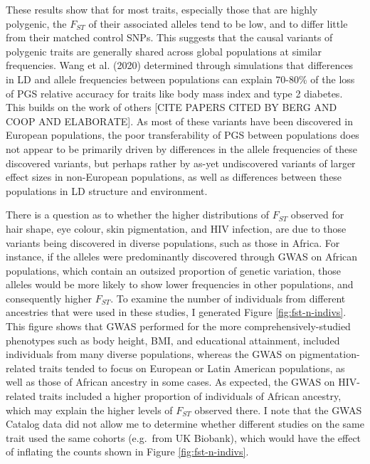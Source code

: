 \documentclass[
]{book}
\begin{document}
These results show that for most traits, especially those that are highly polygenic, the \(F_{ST}\) of their associated alleles tend to be low, and to differ little from their matched control SNPs. This suggests that the causal variants of polygenic traits are generally shared across global populations at similar frequencies. Wang et al. (2020) determined through simulations that differences in LD and allele frequencies between populations can explain 70-80\% of the loss of PGS relative accuracy for traits like body mass index and type 2 diabetes. This builds on the work of others {[}CITE PAPERS CITED BY BERG AND COOP AND ELABORATE{]}. As most of these variants have been discovered in European populations, the poor transferability of PGS between populations does not appear to be primarily driven by differences in the allele frequencies of these discovered variants, but perhaps rather by as-yet undiscovered variants of larger effect sizes in non-European populations, as well as differences between these populations in LD structure and environment.

There is a question as to whether the higher distributions of \(F_{ST}\) observed for hair shape, eye colour, skin pigmentation, and HIV infection, are due to those variants being discovered in diverse populations, such as those in Africa. For instance, if the alleles were predominantly discovered through GWAS on African populations, which contain an outsized proportion of genetic variation, those alleles would be more likely to show lower frequencies in other populations, and consequently higher \(F_{ST}\). To examine the number of individuals from different ancestries that were used in these studies, I generated Figure \ref{fig:fst-n-indivs}. This figure shows that GWAS performed for the more comprehensively-studied phenotypes such as body height, BMI, and educational attainment, included individuals from many diverse populations, whereas the GWAS on pigmentation-related traits tended to focus on European or Latin American populations, as well as those of African ancestry in some cases. As expected, the GWAS on HIV-related traits included a higher proportion of individuals of African ancestry, which may explain the higher levels of \(F_{ST}\) observed there. I note that the GWAS Catalog data did not allow me to determine whether different studies on the same trait used the same cohorts (e.g.~from UK Biobank), which would have the effect of inflating the counts shown in Figure \ref{fig:fst-n-indivs}.
\end{document}
